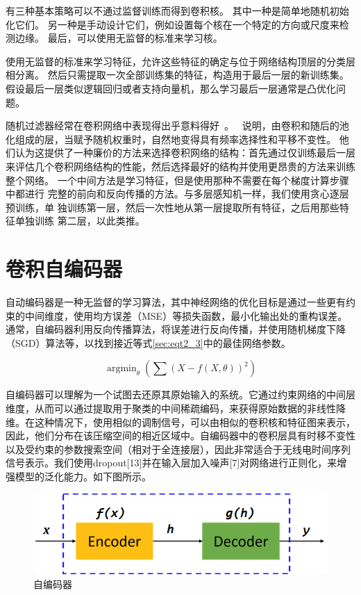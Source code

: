 有三种基本策略可以不通过监督训练而得到卷积核。
其中一种是简单地随机初始化它们。
另一种是手动设计它们，例如设置每个核在一个特定的方向或尺度来检测边缘。
最后，可以使用无监督的标准来学习核。\par

使用无监督的标准来学习特征，允许这些特征的确定与位于网络结构顶层的分类层相分离。
然后只需提取一次全部训练集的特征，构造用于最后一层的新训练集。
假设最后一层类似逻辑回归或者支持向量机，那么学习最后一层通常是凸优化问题。\par


随机过滤器经常在卷积网络中表现得出乎意料得好~\cite{Jarrett-ICCV2009-small,Saxe-ICML2011,pinto2011scaling,cox2011beyond}。
\cite{Saxe-ICML2011}~说明，由卷积和随后的池化组成的层，当赋予随机权重时，自然地变得具有频率选择性和平移不变性。
他们认为这提供了一种廉价的方法来选择卷积网络的结构：首先通过仅训练最后一层来评估几个卷积网络结构的性能，然后选择最好的结构并使用更昂贵的方法来训练整个网络。
一个中间方法是学习特征，但是使用那种不需要在每个梯度计算步骤中都进行
完整的前向和反向传播的方法。与多层感知机一样，我们使用贪心逐层预训练，单
独训练第一层，然后一次性地从第一层提取所有特征，之后用那些特征单独训练
第二层，以此类推。



\section{卷积自编码器}

自动编码器是一种无监督的学习算法，其中神经网络的优化目标是通过一些更有约束的中间维度，使用均方误差（MSE）等损失函数，最小化输出处的重构误差。通常，自编码器利用反向传播算法，将误差进行反向传播，并使用随机梯度下降（SGD）算法等，以找到接近等式\ref{sec:eqt2_3}中的最佳网络参数。

\begin{equation}\label{sec:eqt2_3}
\mathop{\arg\min}_{\theta}(\sum(X − f (X,\theta))^2)
\end{equation}

自编码器可以理解为一个试图去还原其原始输入的系统。它通过约束网络的中间层维度，从而可以通过提取用于聚类的中间稀疏编码，来获得原始数据的非线性降维。在这种情况下，使用相似的调制信号，可以由相似的卷积核和特征图来表示，因此，他们分布在该压缩空间的相近区域中。自编码器中的卷积层具有时移不变性以及受约束的参数搜索空间（相对于全连接层），因此非常适合于无线电时间序列信号表示。我们使用dropout[13]并在输入层加入噪声[7]对网络进行正则化，来增强模型的泛化能力。如下图所示。
\begin{figure}[!h]
	\centering
	\includegraphics[scale=0.8]{figures/chapter_3/AE}
	\caption{自编码器}	\label{fig_3_2}
\end{figure}

